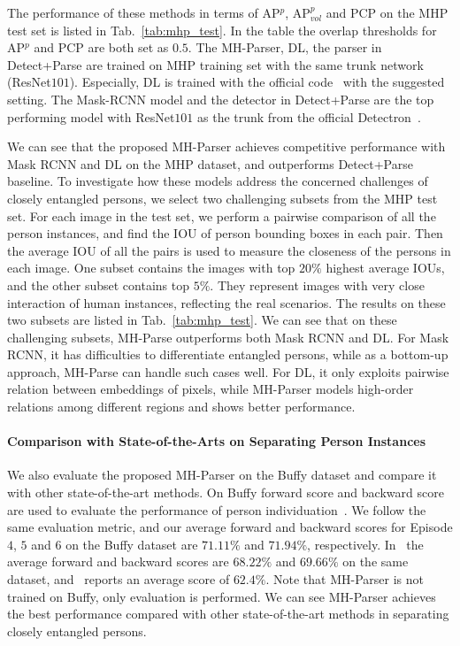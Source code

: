 \documentclass[10pt, letterpaper]{article}
\begin{document}
The performance of these methods in terms of AP$^p$, AP$^p_{vol}$ and PCP on the MHP test set is listed in Tab.~\ref{tab:mhp_test}.  In the table the overlap thresholds for AP$^p$ and PCP are both set as $0.5$. The MH-Parser, DL, the parser in Detect+Parse are trained on MHP training set with the same trunk network (ResNet$101$). Especially, DL is trained with the official code~\cite{de2017semantic,neven2017fast} with the suggested setting. The Mask-RCNN model and the detector in Detect+Parse are the top performing model with ResNet$101$ as the trunk from the official Detectron~\cite{Detectron2018}. 

We can see that the proposed MH-Parser achieves competitive performance with Mask RCNN and DL on  the MHP dataset, and outperforms Detect+Parse baseline.  To investigate how these models address the concerned challenges of closely entangled persons, we select two challenging subsets from the MHP test set. For each image in the test set, we perform a pairwise comparison of all the person instances, and find the IOU of person bounding boxes in each pair. Then the average IOU of all the pairs is used to measure the closeness of the persons in each image. One subset contains the images with top $20\%$ highest average IOUs, and the other subset contains top $5\%$. They represent images with very close interaction of human instances, reflecting the real scenarios. The results on these two subsets are listed in Tab.~\ref{tab:mhp_test}. We can see that on these challenging subsets, MH-Parse outperforms both Mask RCNN and DL. For Mask RCNN, it has difficulties to differentiate entangled persons, while as a bottom-up approach, MH-Parse can handle such cases well. For DL, it only exploits pairwise relation between embeddings of pixels, while MH-Parser models high-order relations among different regions and shows better performance. 

\paragraph{Comparison with State-of-the-Arts on Separating Person Instances}
We also evaluate the proposed MH-Parser on the Buffy dataset and compare it with other state-of-the-art methods. On Buffy forward score and backward score are used to evaluate the performance of person individuation~\cite{jiang2017detangling}. We follow the same evaluation metric, and our average forward and backward scores for Episode $4$, $5$ and $6$ on the Buffy dataset are $71.11\%$ and $71.94\%$, respectively. In~\cite{jiang2017detangling} the average forward and backward scores are $68.22\%$ and $69.66\%$ on the same dataset, and~\cite{vineet2011human} reports an average score of $62.4\%$. Note that MH-Parser is not trained on Buffy, only evaluation is performed. We can see MH-Parser achieves the best performance compared with other state-of-the-art methods in separating closely entangled persons.
\end{document}
